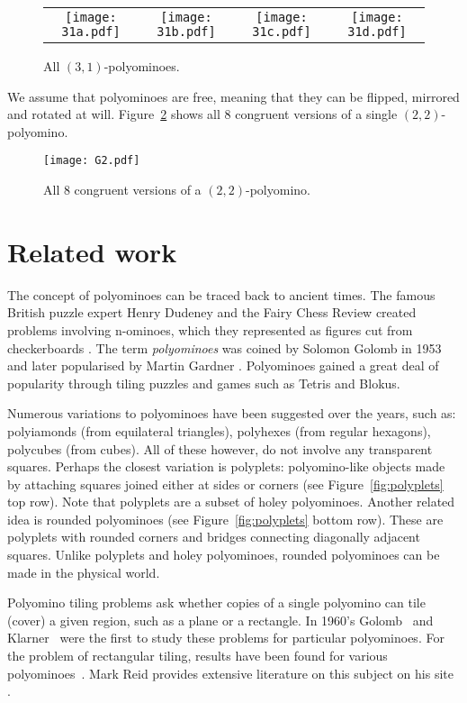 \documentclass[10pt,a4paper]{article}
\theoremstyle{definition}
\begin{document}
\begin{figure}[!htpb]
\centering
\begin{tabular}{cccc}
\texttt{[image: 31a.pdf]} & \texttt{[image: 31b.pdf]} &
\texttt{[image: 31c.pdf]} & \texttt{[image: 31d.pdf]} 
\end{tabular}
\caption{All $(3,1)$-polyominoes.}
\label{fig:31}
\end{figure}

We assume that polyominoes are free, meaning that they can be flipped, mirrored and rotated at will. 
Figure~\ref{fig:G} shows all 8 congruent versions of a single $(2,2)$-polyomino.

\begin{figure}[!htpb]
\centering
\texttt{[image: G2.pdf]}
\caption{All 8 congruent versions of a $(2,2)$-polyomino.}
\label{fig:G}
\end{figure}


\section{Related work}

The concept of polyominoes can be traced back to ancient times. The famous British puzzle expert Henry Dudeney and the Fairy Chess Review
created problems involving n-ominoes, which they represented as figures cut from checkerboards \cite{klarner65}.
The term \emph{polyominoes} was coined by Solomon Golomb in 1953 and later popularised by Martin Gardner \cite{golomb96}.
Polyominoes gained a great deal of popularity through tiling puzzles and games such as Tetris and Blokus.

Numerous variations to polyominoes have been suggested over the years, such as: polyiamonds (from equilateral triangles),
polyhexes (from regular hexagons), polycubes (from cubes). All of these however, do not involve any transparent squares.
Perhaps the closest variation is polyplets: polyomino-like objects made by attaching squares joined either at sides
or corners (see Figure~\ref{fig:polyplets} top row). Note that polyplets are a subset of holey polyominoes. Another related idea is rounded
polyominoes \cite{Harsh} (see Figure~\ref{fig:polyplets} bottom row). These are polyplets with rounded corners and bridges connecting diagonally adjacent squares.
Unlike polyplets and holey polyominoes, rounded polyominoes can be made in the physical world.

Polyomino tiling problems ask whether copies of a single polyomino can tile (cover) a given region, such as a plane or a rectangle.
In 1960's Golomb~\cite{golomb66} and Klarner~\cite{klarner65,klarner69} were the first to study these problems for particular polyominoes.
For the problem of rectangular tiling, results have been found for various polyominoes~\cite{Reid:results,Friedman:rectifiable}. Mark Reid
provides extensive literature on this subject on his site \cite{Reid:literature}.
\end{document}
